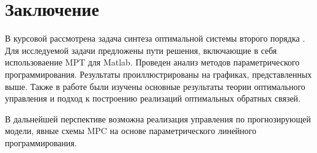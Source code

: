 \chapter*{Заключение}


В курсовой рассмотрена задача синтеза оптимальной системы второго порядка . Для исследуемой задачи предложены пути решения, включающие в себя использоваение MPT для Matlab. Проведен анализ методов параметрического программирования. Результаты проиллюстрированы на графиках, представленных выше. Также в работе были изучены основные результаты теории оптимального управления и подход к построению реализаций оптимальных обратных связей.

В дальнейшей перспективе возможна реализация управления по прогнозирующей модели, явные схемы MPC на основе параметрического линейного программирования.
 